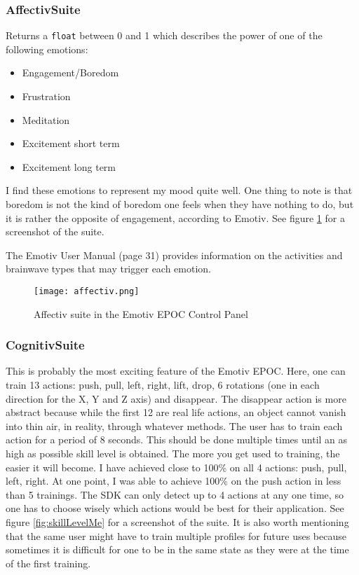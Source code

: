 \subsubsection{Affectiv\texttrademark  Suite}
\label{part:affectiv}
Returns a \texttt{float} between 0 and 1 which describes the power of one of the following emotions:
\begin{itemize}
	\item Engagement/Boredom
	\item Frustration
	\item Meditation
	\item Excitement short term
	\item Excitement long term
\end{itemize}

I find these emotions to represent my mood quite well. One thing to note is that boredom is not the kind of boredom one feels when they have nothing to do, but it is rather the opposite of engagement, according to Emotiv. See figure \ref{fig:affectiv} for a screenshot of the suite.

The Emotiv User Manual \cite{emotivUserManual} (page 31) provides information on the activities and brainwave types that may trigger each emotion.

\begin{figure}
  \centering
  \texttt{[image: affectiv.png]}
  \caption{Affectiv suite in the Emotiv EPOC Control Panel}
    \label{fig:affectiv}           
\end{figure}

\subsubsection{Cognitiv\texttrademark  Suite}
This is probably the most exciting feature of the Emotiv EPOC. Here, one can train 13 actions: push, pull, left, right, lift, drop, 6 rotations (one in each direction for the X, Y and Z axis) and disappear. The disappear action is more abstract because while the first 12 are real life actions, an object cannot vanish into thin air, in reality, through whatever methods. The user has to train each action for a period of 8 seconds. This should be done multiple times until an as high as possible skill level is obtained. The more you get used to training, the easier it will become. I have achieved close to 100\% on all 4 actions: push, pull, left, right. At one point, I was able to achieve 100\% on the push action in less than 5 trainings. The SDK can only detect up to 4 actions at any one time, so one has to choose wisely which actions would be best for their application. See figure \ref{fig:skillLevelMe} for a screenshot of the suite. It is also worth mentioning that the same user might have to train multiple profiles for future uses because sometimes it is difficult for one to be in the same state as they were at the time of the first training. 

